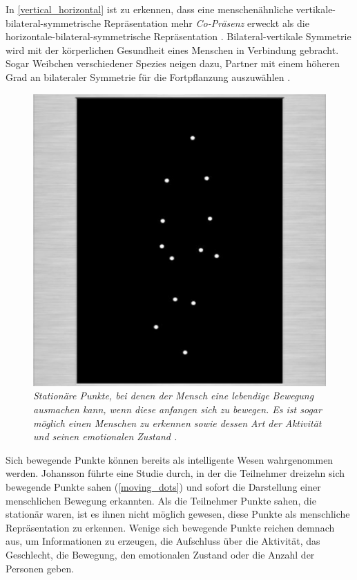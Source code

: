 \documentclass[a4paper,11pt]{article}%
\renewcommand{\\}{\vspace*{0.5\baselineskip} \newline}
\begin{document}
In \autoref{vertical_horizontal} ist zu erkennen, dass eine menschenähnliche vertikale-bilateral-symmetrische Repräsentation mehr \textit{Co-Präsenz} erweckt als die horizontale-bilateral-symmetrische Repräsentation \citep[S.546-551]{thornhill1998relative}.
Bilateral-vertikale Symmetrie wird mit der körperlichen Gesundheit eines Menschen in Verbindung gebracht. Sogar Weibchen verschiedener Spezies neigen dazu, Partner mit einem höheren Grad an bilateraler Symmetrie für die Fortpflanzung auszuwählen \citep[S. 659–669]{rhodes1998facial} \citep{biocca2002defining} \citep[S.233–242]{grammer1994human}.

\begin{figure}[b!]
		\begin{footnotesize}
		\centering
			\includegraphics[scale= 0.5]{Abbildungen/moving_dots.JPG}
			\caption[Moving dots]{\textit{Stationäre Punkte, bei denen der Mensch eine lebendige Bewegung ausmachen kann, wenn diese anfangen sich zu bewegen. Es ist sogar möglich einen Menschen zu erkennen sowie dessen Art der Aktivität und seinen emotionalen Zustand \citep{biocca2002defining} \citep[S.76-89]{johansson1975visual}.}}
			\label{moving_dots}
		\end{footnotesize}
	\end{figure}

Sich bewegende Punkte können bereits als intelligente Wesen wahrgenommen werden. Johansson \citep[S.76-89]{johansson1975visual} führte eine Studie durch, in der die Teilnehmer dreizehn sich bewegende Punkte sahen (\autoref{moving_dots}) und sofort die Darstellung einer menschlichen Bewegung erkannten. Als die Teilnehmer Punkte sahen, die stationär waren, ist es ihnen nicht möglich gewesen, diese Punkte als menschliche Repräsentation zu erkennen. Wenige sich bewegende Punkte reichen demnach aus, um Informationen zu erzeugen, die Aufschluss über die Aktivität, das Geschlecht, die Bewegung, den emotionalen Zustand oder die Anzahl der Personen geben.
\end{document}
